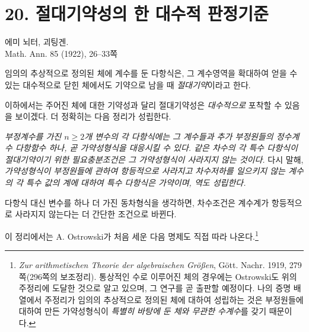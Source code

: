
\section*{20. 절대기약성의 한 대수적 판정기준}
\begin{center}
에미 뇌터, 괴팅겐.\\[0.6em]
Math. Ann. 85 (1922), 26--33쪽
\end{center}

임의의 추상적으로 정의된 체에 계수를 둔 다항식은, 그 계수영역을 확대하여 얻을 수 있는 대수적으로 닫힌 체에서도 기약으로 남을 때 \emph{절대기약}이라고 한다.
\addtocounter{footnote}{1}
이하에서는 주어진 체에 대한 기약성과 달리 절대기약성은 \emph{대수적으로} 포착할 수 있음을 보이겠다. 더 정확히는 다음 정리가 성립한다.

\emph{부정계수를 가진 \(n\ge2\)개 변수의 각 다항식에는 그 계수들과 추가 부정원들의 정수계수 다항함수 하나, 곧 가약성형식을 대응시킬 수 있다. 같은 차수의 각 특수 다항식이 절대기약이기 위한 필요충분조건은 그 가약성형식이 사라지지 않는 것이다.} 다시 말해, \emph{가약성형식이 부정원들에 관하여 항등적으로 사라지고 차수저하를 일으키지 않는 계수의 각 특수 값의 계에 대하여 특수 다항식은 가약이며, 역도 성립한다.}

다항식 대신 변수를 하나 더 가진 동차형식을 생각하면, 차수조건은 계수계가 항등적으로 사라지지 않는다는 더 간단한 조건으로 바뀐다.

이 정리에서는 A. Ostrowski가 처음 세운 다음 명제도 직접 따라 나온다.\footnote{\emph{Zur arithmetischen Theorie der algebraischen Größen}, Gött. Nachr. 1919, 279쪽(296쪽의 보조정리). 통상적인 수로 이루어진 체의 경우에는 Ostrowski도 위의 주정리에 도달한 것으로 알고 있으며, 그 연구를 곧 출판할 예정이다. 나의 증명 배열에서 주정리가 임의의 추상적으로 정의된 체에 대하여 성립하는 것은 부정원들에 대하여 만든 가약성형식이 \emph{특별히 바탕에 둔 체와 무관한 수계수}를 갖기 때문이다.}

